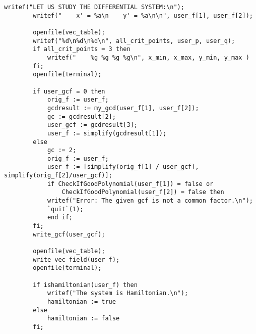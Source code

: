 \documentclass[a4paper,10pt]{article}
\begin{document}
\begin{lstlisting}[name=main]
        writef("LET US STUDY THE DIFFERENTIAL SYSTEM:\n");
        writef("    x' = %a\n    y' = %a\n\n", user_f[1], user_f[2]);

        openfile(vec_table);
        writef("%d\n%d\n%d\n", all_crit_points, user_p, user_q);
        if all_crit_points = 3 then
            writef("    %g %g %g %g\n", x_min, x_max, y_min, y_max )
        fi;
        openfile(terminal);

        if user_gcf = 0 then
            orig_f := user_f;
            gcdresult := my_gcd(user_f[1], user_f[2]);
            gc := gcdresult[2];
            user_gcf := gcdresult[3];
            user_f := simplify(gcdresult[1]);
        else
            gc := 2;
            orig_f := user_f;
            user_f := [simplify(orig_f[1] / user_gcf), simplify(orig_f[2]/user_gcf)];
            if CheckIfGoodPolynomial(user_f[1]) = false or
                CheckIfGoodPolynomial(user_f[2]) = false then
            writef("Error: The given gcf is not a common factor.\n");
            `quit`(1);
            end if;
        fi;
        write_gcf(user_gcf);

        openfile(vec_table);
        write_vec_field(user_f);
        openfile(terminal);

        if ishamiltonian(user_f) then
            writef("The system is Hamiltonian.\n");
            hamiltonian := true
        else
            hamiltonian := false
        fi;


\end{lstlisting}
\end{document}
